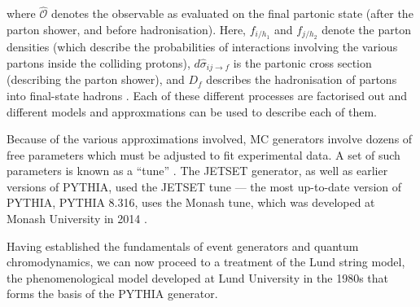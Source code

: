\documentclass[12pt,a4paper]{report}
\begin{document}
where $\hat{\mathcal{O}}$ denotes the observable as evaluated on the final partonic state (after the parton shower, and before hadronisation). Here, $f_{i/h_1}$ and $f_{j/h_2}$ denote the parton densities (which describe the probabilities of interactions involving the various partons inside the colliding protons), $d\hat{\sigma}_{ij\rightarrow f}$ is the partonic cross section (describing the parton shower), and $D_f$ describes the hadronisation of partons into final-state hadrons \cite{Skands:2012ts}. Each of these different processes are factorised out and different models and approxmations can be used to describe each of them.

Because of the various approximations involved, MC generators involve dozens of free parameters which must be adjusted to fit experimental data. A set of such parameters is known as a ``tune'' \cite{Bierlich:2022pfr,Buckley:2011ms}. The JETSET generator, as well as earlier versions of PYTHIA, used the JETSET tune --- the most up-to-date version of PYTHIA, PYTHIA 8.316, uses the Monash tune, which was developed at Monash University in 2014 \cite{Bierlich:2022pfr,Skands:2014pea}.

Having established the fundamentals of event generators and quantum chromodynamics, we can now proceed to a treatment of the Lund string model, the phenomenological model developed at Lund University in the 1980s that forms the basis of the PYTHIA generator.
\end{document}
